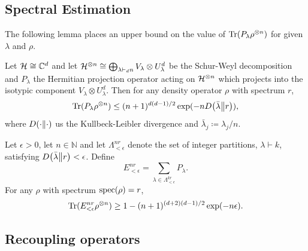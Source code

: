 \documentclass[notitlepage]{article}
\begin{document}
\subsection{Spectral Estimation}

The following lemma \cite{christandl2008quantum} places an upper bound on the value of $\operatorname{Tr}(P_{\lambda} \rho^{\otimes n})$ for given $\lambda$ and $\rho$.
\begin{lem}
    Let $\mathcal H \cong \mathbb C^{d}$ and let $\mathcal H^{\otimes n} \cong \bigoplus_{\lambda \vdash_{d} n} V_{\lambda} \otimes U_{\lambda}^{d}$ be the Schur-Weyl decomposition and $P_{\lambda}$ the Hermitian projection operator acting on $\mathcal H^{\otimes n}$ which projects into the isotypic component $V_{\lambda} \otimes U_{\lambda}^{d}$. Then for any density operator $\rho$ with spectrum $r$,
    \begin{equation}
        \operatorname{Tr}(P_{\lambda} \rho^{\otimes n}) \leq (n+1)^{d(d-1)/2} \exp(-n D\!\left(\bar \lambda\middle\|r\right)),
    \end{equation}
    where $D\!\left(\cdot\middle\|\cdot\right)$ us the Kullbeck-Leibler divergence and $\bar \lambda_j \coloneqq \lambda_j/n$.
\end{lem}

\begin{cor}
    Let $\epsilon > 0$, let $n \in \mathbb N$ and let $\Lambda_{<\epsilon}^{nr}$ denote the set of integer partitions, $\lambda \vdash k$, satisfying $D\!\left(\bar\lambda\middle\|r\right) < \epsilon$.
    Define
    \begin{equation}
        E_{<\epsilon}^{nr} = \sum_{\lambda \in \Lambda_{<\epsilon}^{kr}} P_{\lambda}.
    \end{equation}
    For any $\rho$ with spectrum $\operatorname{spec}(\rho) = r$,
    \begin{equation}
        \operatorname{Tr}(E_{<\epsilon}^{nr} \rho^{\otimes n}) \geq 1 - (n+1)^{(d+2)(d-1)/2} \exp(-n \epsilon).
    \end{equation}
\end{cor}

\subsection{Recoupling operators}
\end{document}
